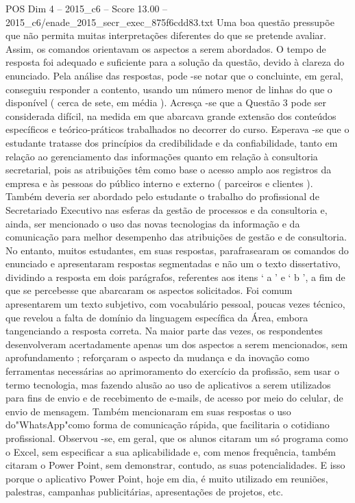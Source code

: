 \begin{textsample}{POS Dim 4 – 2015\_c6 – Score 13.00 – 2015\_c6/enade\_2015\_secr\_exec\_875f6cdd83.txt}
Uma boa questão pressupõe que não permita muitas interpretações diferentes do que se pretende avaliar.
Assim, os comandos orientavam os aspectos a serem abordados.
O tempo de resposta foi adequado e suficiente para a solução da questão, devido à clareza do enunciado.
Pela análise das respostas, pode -se notar que o concluinte, em geral, conseguiu responder a contento, usando um número menor de linhas do que o disponível ( cerca de sete, em média ).
Acresça -se que a Questão 3 pode ser considerada difícil, na medida em que abarcava grande extensão dos conteúdos específicos e teórico-práticos trabalhados no decorrer do curso.
Esperava -se que o estudante tratasse dos princípios da credibilidade e da confiabilidade, tanto em relação ao gerenciamento das informações quanto em relação à consultoria secretarial, pois as atribuições têm como base o acesso amplo aos registros da empresa e às pessoas do público interno e externo ( parceiros e clientes ).
Também deveria ser abordado pelo estudante o trabalho do profissional de Secretariado Executivo nas esferas da gestão de processos e da consultoria e, ainda, ser mencionado o uso das novas tecnologias da informação e da comunicação para melhor desempenho das atribuições de gestão e de consultoria.
No entanto, muitos estudantes, em suas respostas, parafrasearam os comandos do enunciado e apresentaram respostas segmentadas e não um o texto dissertativo, dividindo a resposta em dois parágrafos, referentes aos itens ‘ a ’ e ‘ b ’, a fim de que se percebesse que abarcaram os aspectos solicitados.
Foi comum apresentarem um texto subjetivo, com vocabulário pessoal, poucas vezes técnico, que revelou a falta de domínio da linguagem específica da Área, embora tangenciando a resposta correta.
Na maior parte das vezes, os respondentes desenvolveram acertadamente apenas um dos aspectos a serem mencionados, sem aprofundamento ; reforçaram o aspecto da mudança e da inovação como ferramentas necessárias ao aprimoramento do exercício da profissão, sem usar o termo tecnologia, mas fazendo alusão ao uso de aplicativos a serem utilizados para fins de envio e de recebimento de e-mails, de acesso por meio do celular, de envio de mensagem.
Também mencionaram em suas respostas o uso do"WhatsApp"como forma de comunicação rápida, que facilitaria o cotidiano profissional.
Observou -se, em geral, que os alunos citaram um só programa como o Excel, sem especificar a sua aplicabilidade e, com menos frequência, também citaram o Power Point, sem demonstrar, contudo, as suas potencialidades.
E isso porque o aplicativo Power Point, hoje em dia, é muito utilizado em reuniões, palestras, campanhas publicitárias, apresentações de projetos, etc.

\end{textsample}
